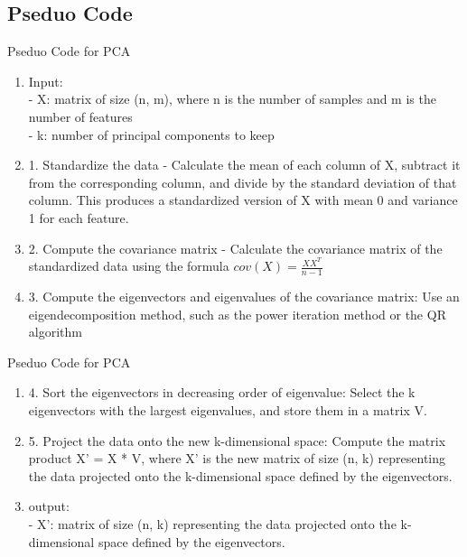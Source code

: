 \documentclass{beamer}
\begin{document}
\subsection{Pseduo Code}
\begin{frame}{Pseduo Code for PCA}
    \begin{enumerate}
        \item Input: \\
              - X: matrix of size (n, m), where n is the number of samples and m is the number of features\\
              - k: number of principal components to keep
        \item 1. Standardize the data - Calculate the mean of each column of X, subtract it from the corresponding column, and divide by the standard deviation of that column. This produces a standardized version of X with mean 0 and variance 1 for each feature.
        \item 2. Compute the covariance matrix - Calculate the covariance matrix of the standardized data using the formula $cov(X) = \frac{XX^T}{n - 1}$
        \item 3. Compute the eigenvectors and eigenvalues of the covariance matrix: Use an eigendecomposition method, such as the power iteration method or the QR algorithm

    \end{enumerate}
\end{frame}

\begin{frame}{Pseduo Code for PCA}
    \begin{enumerate}
        \item 4. Sort the eigenvectors in decreasing order of eigenvalue: Select the k eigenvectors with the largest eigenvalues, and store them in a matrix V.
        \item 5. Project the data onto the new k-dimensional space: Compute the matrix product X' = X * V, where X' is the new matrix of size (n, k) representing the data projected onto the k-dimensional space defined by the eigenvectors.
        \item output:\\
              - X': matrix of size (n, k) representing the data projected onto the k-dimensional space defined by the eigenvectors.

    \end{enumerate}
\end{frame}
\end{document}
